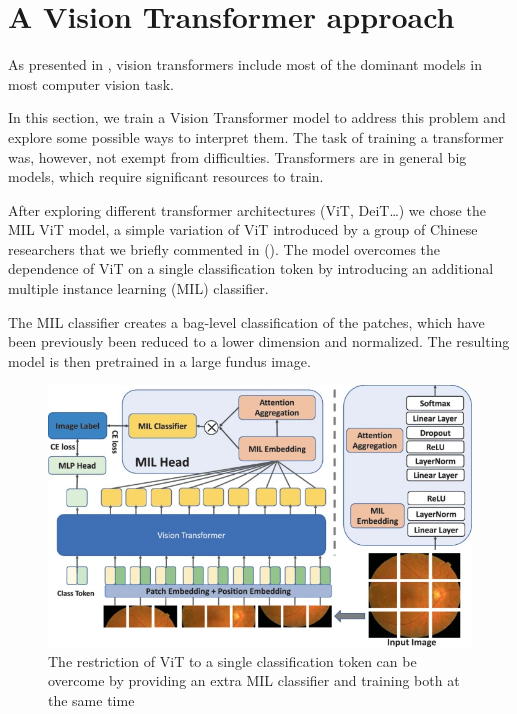 \chapter{A Vision Transformer approach}\label{chapter8}
As presented in , vision transformers include most of the dominant models in most computer vision task.

In this section, we train a Vision Transformer model to address this problem and explore some possible ways to interpret them. The task of training a transformer was, however, not exempt from difficulties. Transformers are in general big models, which require significant resources to train.

After exploring different transformer architectures (ViT, DeiT…) we chose the MIL ViT model, a simple variation of ViT introduced by a group of Chinese researchers that we briefly commented in  (). The model overcomes the dependence of ViT on a single classification token by introducing an additional multiple instance learning (MIL) classifier.

The MIL classifier creates a bag-level classification of the patches, which have been previously been reduced to a lower dimension and normalized. The resulting model is then pretrained in a large fundus image.

\begin{figure}[tb]
    \centering
    \includegraphics[width=\textwidth]{figures/chapter7/mil_vt.png}
    \caption{The restriction of ViT to a single classification token can be overcome by providing an extra MIL classifier and training both at the same time \cite{suang2021milvt}}
    \label{fig:mil_vt}
\end{figure}


